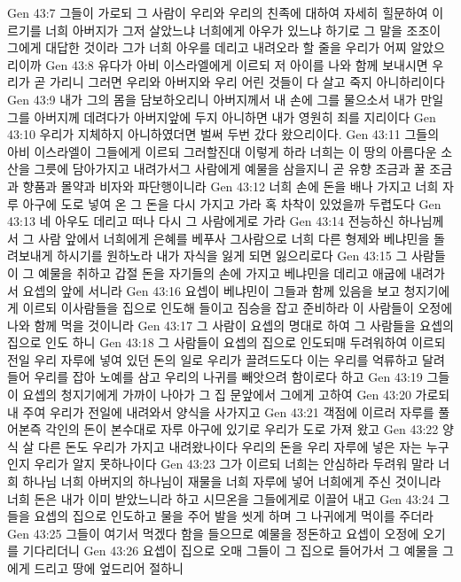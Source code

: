 Gen 43:7  그들이 가로되 그 사람이 우리와 우리의 친족에 대하여 자세히 힐문하여 이르기를 너희 아버지가 그저 살았느냐 너희에게 아우가 있느냐 하기로 그 말을 조조이 그에게 대답한 것이라 그가 너희 아우를 데리고 내려오라 할 줄을 우리가 어찌 알았으리이까
Gen 43:8  유다가 아비 이스라엘에게 이르되 저 아이를 나와 함께 보내시면 우리가 곧 가리니 그러면 우리와 아버지와 우리 어린 것들이 다 살고 죽지 아니하리이다
Gen 43:9  내가 그의 몸을 담보하오리니 아버지께서 내 손에 그를 물으소서 내가 만일 그를 아버지께 데려다가 아버지앞에 두지 아니하면 내가 영원히 죄를 지리이다
Gen 43:10  우리가 지체하지 아니하였더면 벌써 두번 갔다 왔으리이다.
Gen 43:11  그들의 아비 이스라엘이 그들에게 이르되 그러할진대 이렇게 하라 너희는 이 땅의 아름다운 소산을 그릇에 담아가지고 내려가서그 사람에게 예물을 삼을지니 곧 유향 조금과 꿀 조금과 향품과 몰약과 비자와 파단행이니라
Gen 43:12  너희 손에 돈을 배나 가지고 너희 자루 아구에 도로 넣여 온 그 돈을 다시 가지고 가라 혹 차착이 있었을까 두렵도다
Gen 43:13  네 아우도 데리고 떠나 다시 그 사람에게로 가라
Gen 43:14  전능하신 하나님께서 그 사람 앞에서 너희에게 은혜를 베푸사 그사람으로 너희 다른 형제와 베냐민을 돌려보내게 하시기를 원하노라 내가 자식을 잃게 되면 잃으리로다
Gen 43:15  그 사람들이 그 예물을 취하고 갑절 돈을 자기들의 손에 가지고 베냐민을 데리고 애굽에 내려가서 요셉의 앞에 서니라
Gen 43:16  요셉이 베냐민이 그들과 함께 있음을 보고 청지기에게 이르되 이사람들을 집으로 인도해 들이고 짐승을 잡고 준비하라 이 사람들이 오정에 나와 함께 먹을 것이니라
Gen 43:17  그 사람이 요셉의 명대로 하여 그 사람들을 요셉의 집으로 인도 하니
Gen 43:18  그 사람들이 요셉의 집으로 인도되매 두려워하여 이르되 전일 우리 자루에 넣여 있던 돈의 일로 우리가 끌려드도다 이는 우리를 억류하고 달려들어 우리를 잡아 노예를 삼고 우리의 나귀를 빼앗으려 함이로다 하고
Gen 43:19  그들이 요셉의 청지기에게 가까이 나아가 그 집 문앞에서 그에게 고하여
Gen 43:20  가로되 내 주여 우리가 전일에 내려와서 양식을 사가지고
Gen 43:21  객점에 이르러 자루를 풀어본즉 각인의 돈이 본수대로 자루 아구에 있기로 우리가 도로 가져 왔고
Gen 43:22  양식 살 다른 돈도 우리가 가지고 내려왔나이다 우리의 돈을 우리 자루에 넣은 자는 누구인지 우리가 알지 못하나이다
Gen 43:23  그가 이르되 너희는 안심하라 두려워 말라 너희 하나님 너희 아버지의 하나님이 재물을 너희 자루에 넣어 너희에게 주신 것이니라 너희 돈은 내가 이미 받았느니라 하고 시므온을 그들에게로 이끌어 내고
Gen 43:24  그들을 요셉의 집으로 인도하고 물을 주어 발을 씻게 하며 그 나귀에게 먹이를 주더라
Gen 43:25  그들이 여기서 먹겠다 함을 들으므로 예물을 정돈하고 요셉이 오정에 오기를 기다리더니
Gen 43:26  요셉이 집으로 오매 그들이 그 집으로 들어가서 그 예물을 그에게 드리고 땅에 엎드리어 절하니
